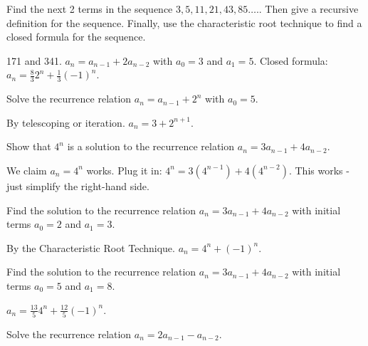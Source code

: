 \begin{questions}

\question Find the next 2 terms in the sequence $3, 5, 11, 21, 43, 85\ldots.$.  Then give a recursive definition for the sequence.  Finally, use the characteristic root technique to find a closed formula for the sequence.

	\begin{answer}
		171 and 341.  $a_n = a_{n-1} + 2a_{n-2}$ with $a_0 = 3$ and $a_1 = 5$.  Closed formula: $a_n = \frac{8}{3}2^n + \frac{1}{3}(-1)^n$.
	\end{answer}
	
	
	


\question Solve the recurrence relation $a_n = a_{n-1} + 2^n$ with $a_0 = 5$.

	\begin{answer}
		By telescoping or iteration.  $a_n = 3 + 2^{n+1}$.
	\end{answer}
	
	
	


\question Show that $4^n$ is a solution to the recurrence relation $a_n = 3a_{n-1} + 4a_{n-2}$.

	\begin{answer}
		We claim $a_n = 4^n$ works.  Plug it in: $4^n = 3(4^{n-1}) + 4(4^{n-2})$.  This works - just simplify the right-hand side.
	\end{answer}
	
	
	


\question Find the solution to the recurrence relation $a_n = 3a_{n-1} + 4a_{n-2}$ with initial terms $a_0 = 2$ and $a_1 = 3$.

	\begin{answer}
		By the Characteristic Root Technique.  $a_n = 4^n + (-1)^n$.
	\end{answer}
	
	
	


\question Find the solution to the recurrence relation $a_n = 3a_{n-1} + 4a_{n-2}$ with initial terms $a_0 = 5$ and $a_1 = 8$.

	\begin{answer}
		$a_n = \frac{13}{5} 4^n + \frac{12}{5} (-1)^n$.
	\end{answer}
	
	
	


\question Solve the recurrence relation $a_n = 2a_{n-1} - a_{n-2}$.
\begin{parts}

\end{parts}
\end{questions}
